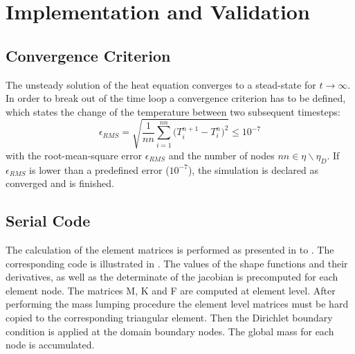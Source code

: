\section{Implementation and Validation}

\subsection{Convergence Criterion}
The unsteady solution of the heat equation converges to a stead-state for $t\rightarrow \infty$. In order to break out of the time loop a convergence criterion has to be defined, which states the change of the temperature between two subsequent timesteps:
\begin{equation}
	\epsilon_{RMS} = \sqrt{\frac{1}{nn} \sum_{i=1}^{nn} \Big( T_i^{n+1} - T_i^n \Big)^2} \leq 10^{-7}
\end{equation}
with the root-mean-square error $\epsilon_{RMS}$ and the number of nodes $nn \in \eta \backslash \eta_D$. If $\epsilon_{RMS}$ is lower than a predefined error ($10^{-7}$), the simulation is declared as converged and is finished.

\subsection{Serial Code}

The calculation of the element matrices is performed as presented in  to . The corresponding code is illustrated in . The values of the shape functions and their derivatives, as well as the determinate of the jacobian is precomputed for each element node. The matrices M, K and F are computed at element level. After performing the mass lumping procedure the element level matrices must be hard copied to the corresponding triangular element.
Then the Dirichlet boundary condition  is applied at the domain boundary nodes. The global mass for each node is accumulated. 

